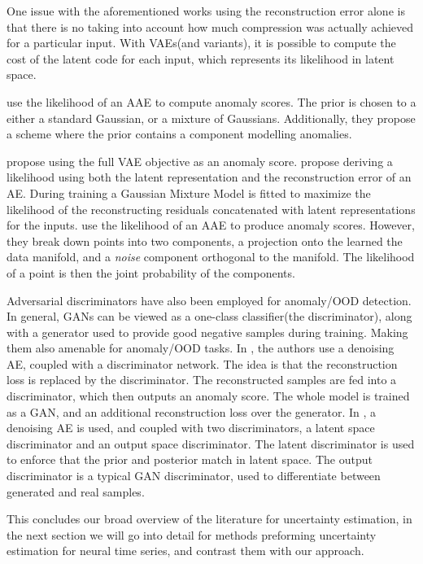 \documentclass[../main.tex]{subfiles}
\begin{document}
One issue with the aforementioned works using the reconstruction error alone is that there is no taking into account how much compression was actually achieved for a particular input.
With VAEs(and variants), it is possible to compute the cost of the latent code for each input, which represents its likelihood in latent space. 

\citet{leveau2017adversarial} use the likelihood of an AAE to compute anomaly scores. The prior is chosen to a either a standard Gaussian, or a mixture of Gaussians. Additionally, they propose a scheme where the prior contains a component modelling anomalies. 

\cite{vasilev2018q} propose using the full VAE objective as an anomaly score. \citet{zong2018deep} propose deriving a likelihood using both the latent representation and the reconstruction error of an AE. During training a Gaussian Mixture Model is fitted to maximize the likelihood of the reconstructing residuals concatenated with latent representations for the inputs. 
\citet{pidhorskyi2018generative} use the likelihood of an AAE to produce anomaly scores. However, they break down points into two components, a projection onto the learned the data manifold, and a \emph{noise} component orthogonal to the manifold. The likelihood of a point is then the joint probability of the components. 

Adversarial discriminators have also been employed for anomaly/OOD detection. In general, GANs can be viewed as a one-class classifier(the discriminator), along with a generator used to provide good negative samples during training. Making them also amenable for anomaly/OOD tasks.
In \citep{sabokrou2018adversarially}, the authors use a denoising AE, coupled with a discriminator network. The idea is that the reconstruction loss is replaced by the discriminator. The reconstructed samples are fed into a discriminator, which then outputs an anomaly score. The whole model is trained as a GAN, and an additional reconstruction loss over the generator. In \citep{perera2019ocgan}, a denoising AE is used, and coupled with two discriminators, a latent space discriminator and an output space discriminator. The latent discriminator is used to enforce that the prior and posterior match in latent space. The output discriminator is a typical GAN discriminator, used to differentiate between generated and real samples.  

This concludes our broad overview of the literature for uncertainty estimation, in the next section we will go into detail for methods preforming uncertainty estimation for neural time series, and contrast them with our approach. 
\end{document}
